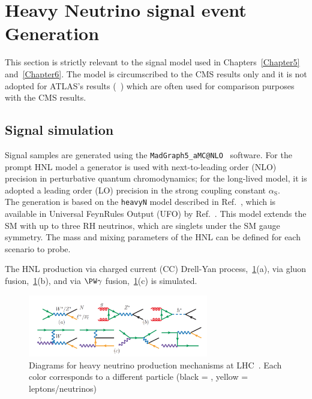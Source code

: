 \clearpage
\section{Heavy Neutrino signal event Generation}\label{sec:c4hnl}
This section is strictly relevant to the signal model used in
Chapters~\ref{Chapter5} and~\ref{Chapter6}. The model is circumscribed to the
CMS results only and it is not adopted for ATLAS's
results (~\cite{atlasintro2}) which are often used for comparison
purposes with the CMS results.



\subsection{Signal simulation}\label{sec:c4hnlmodel}

Signal samples are generated using the
\texttt{MadGraph5\_aMC@NLO}~\cite{Alwall_2014} software. 
For the prompt HNL
model a generator is used with next-to-leading order (NLO) precision
in perturbative quantum chromodynamics; for the long-lived model, it
is adopted a leading order (LO) precision in the strong
coupling constant $\alpha_{\mathrm{S}}$.\\
The generation is based on the \texttt{heavyN} model described in
Ref.~\cite{Atre:2009rg}, which is available in Universal FeynRules
Output (UFO) by Ref.~\cite{Alva:2014gxa,Degrande_2016,heavyN}.
This model extends the SM with up to three RH neutrinos,
which are singlets under the SM gauge symmetry.
The mass and mixing parameters of the HNL can be defined for each
scenario to probe.

The HNL production via charged current (CC) Drell-Yan
process,~\ref{fid:hnl_production}(a), via gluon
fusion,~\ref{fid:hnl_production}(b), and via $\PW \gamma$
fusion,~\ref{fid:hnl_production}(c) is simulated. 
\begin{figure}[h!]
\centering
 \includegraphics[clip,trim=0cm 0cm 0cm 1cm, width=0.70\textwidth]{Figures/c4/hnl_production}
  \caption{Diagrams for heavy neutrino production mechanisms at
    LHC~\cite{Pascoli_2019}. Each color corresponds to a different
    particle (black = \hnl, yellow = leptons/neutrinos)}
  \label{fid:hnl_production}
\end{figure}

